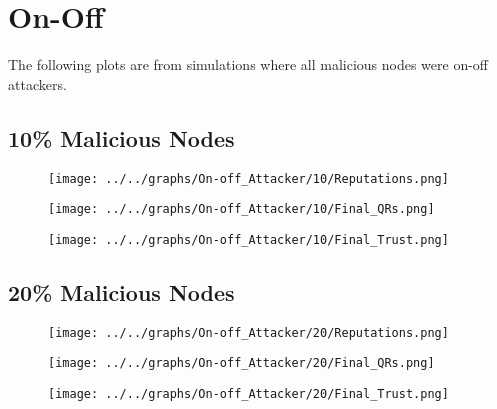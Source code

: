 \section*{On-Off}
The following plots are from simulations where all malicious nodes were
on-off attackers.
\\
\begin{minipage}[t]{0.49\columnwidth}
\subsection*{10\% Malicious Nodes}
    \begin{figure}[H]
        \centering
        \texttt{[image: ../../graphs/On-off\_Attacker/10/Reputations.png]}
    \end{figure}
    \begin{figure}[H]
        \centering
        \texttt{[image: ../../graphs/On-off\_Attacker/10/Final\_QRs.png]}
    \end{figure}
\end{minipage}
\begin{minipage}[t]{0.49\columnwidth}
    \begin{figure}[H]
        \centering
        \texttt{[image: ../../graphs/On-off\_Attacker/10/Final\_Trust.png]}
    \end{figure}
\end{minipage}

\begin{minipage}[t]{0.49\columnwidth}
\subsection*{20\% Malicious Nodes}
    \begin{figure}[H]
        \centering
        \texttt{[image: ../../graphs/On-off\_Attacker/20/Reputations.png]}
    \end{figure}
    \begin{figure}[H]
        \centering
        \texttt{[image: ../../graphs/On-off\_Attacker/20/Final\_QRs.png]}
    \end{figure}
\end{minipage}
\begin{minipage}[t]{0.49\columnwidth}
    \begin{figure}[H]
        \centering
        \texttt{[image: ../../graphs/On-off\_Attacker/20/Final\_Trust.png]}
    \end{figure}
\end{minipage}


